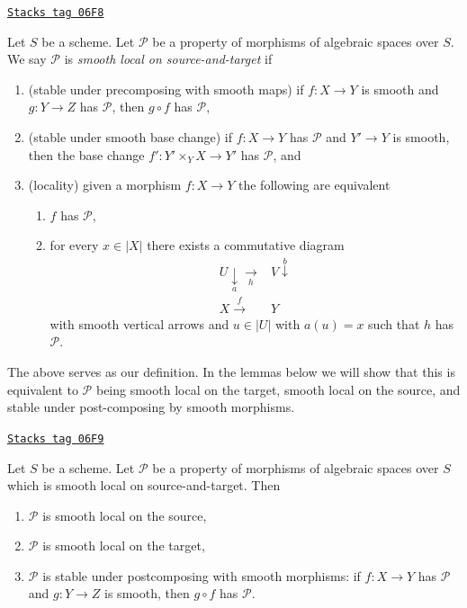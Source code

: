 \begin{definition}
\label{spaces-descent-definition-local-source-target}
\href{https://stacks.math.columbia.edu/tag/06F8}{\texttt{Stacks tag 06F8}}

Let $S$ be a scheme.
Let $\mathcal{P}$ be a property of morphisms of algebraic spaces over $S$.
We say $\mathcal{P}$ is {\it smooth local on source-and-target} if
\begin{enumerate}
\item (stable under precomposing with smooth maps)
if $f : X \to Y$ is smooth and $g : Y \to Z$ has $\mathcal{P}$,
then $g \circ f$ has $\mathcal{P}$,
\item (stable under smooth base change)
if $f : X \to Y$ has $\mathcal{P}$ and $Y' \to Y$ is smooth, then
the base change $f' : Y' \times_Y X \to Y'$ has $\mathcal{P}$, and
\item (locality) given a morphism $f : X \to Y$ the following are
equivalent
\begin{enumerate}
\item $f$ has $\mathcal{P}$,
\item for every $x \in |X|$ there exists a commutative diagram
$$
\begin{array}{cc}U \underset{a}{\downarrow}\underset{h}{\longrightarrow} & V \overset{b}{\downarrow} \\ X \overset{f}{\longrightarrow} & Y\end{array}
$$
with smooth vertical arrows and $u \in |U|$ with $a(u) = x$ such that
$h$ has $\mathcal{P}$.
\end{enumerate}
\end{enumerate}
\end{definition}

The above serves as our definition. In the lemmas below we will show that
this is equivalent to $\mathcal{P}$ being smooth local on the target,
smooth local on the source, and stable under post-composing by smooth morphisms.

\begin{lemma}
\label{spaces-descent-lemma-local-source-target-implies}
\href{https://stacks.math.columbia.edu/tag/06F9}{\texttt{Stacks tag 06F9}}

Let $S$ be a scheme.
Let $\mathcal{P}$ be a property of morphisms of algebraic spaces over $S$
which is smooth local on source-and-target. Then
\begin{enumerate}
\item $\mathcal{P}$ is smooth local on the source,
\item $\mathcal{P}$ is smooth local on the target,
\item $\mathcal{P}$ is stable under postcomposing with smooth morphisms:
if $f : X \to Y$ has $\mathcal{P}$ and $g : Y \to Z$ is smooth, then
$g \circ f$ has $\mathcal{P}$.
\end{enumerate}
\end{lemma}

